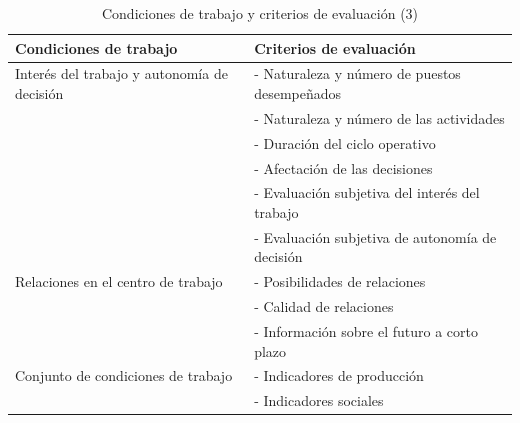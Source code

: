 \documentclass{article} %
\begin{document}
    \begin{table}[h!]
    \centering
    \begin{tabular}{|l|l|}
    \hline
    \textbf{Condiciones de trabajo}          & \textbf{Criterios de evaluación}                                  \\ \hline
    Interés del trabajo y autonomía de decisión & - Naturaleza y número de puestos desempeñados                     \\
                                             & - Naturaleza y número de las actividades                          \\
                                             & - Duración del ciclo operativo                                    \\
                                             & - Afectación de las decisiones                                    \\
                                             & - Evaluación subjetiva del interés del trabajo                    \\
                                             & - Evaluación subjetiva de autonomía de decisión                   \\ \hline
    Relaciones en el centro de trabajo       & - Posibilidades de relaciones                                     \\
                                             & - Calidad de relaciones                                           \\
                                             & - Información sobre el futuro a corto plazo                       \\ \hline
    Conjunto de condiciones de trabajo       & - Indicadores de producción                                       \\
                                             & - Indicadores sociales                                            \\ \hline
    \end{tabular}
    \caption{Condiciones de trabajo y criterios de evaluación (3)}
    \end{table}

\newpage    
\end{document}
